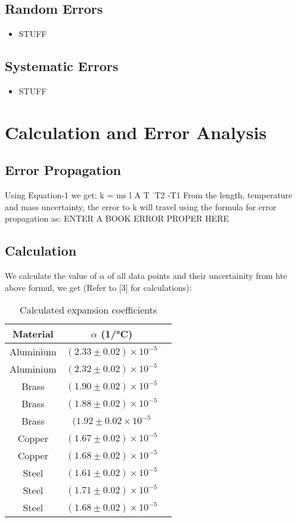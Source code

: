 \documentclass[%
 sor,
 jor,
 amsmath,amssymb,
 reprint,
]{revtex4-2}
\begin{document}
\subsection{Random Errors}
\begin{itemize}
	\item STUFF
\end{itemize}

\subsection{Systematic Errors}
\begin{itemize}
	\item STUFF
\end{itemize}



\section{Calculation and Error Analysis}
\subsection{Error Propagation}
Using Equation-1 we get: k = ms l A T ˙T2 -T1 From the length, temperature and mass uncertainty, the error to k will travel using the formula for error propagation as: ENTER A BOOK ERROR PROPER HERE 
\subsection{Calculation}
We calculate the value of $\alpha$ of all data points and their uncertainity from hte above formul,  we get (Refer to [3] for calculations):

\begin{table}[h]
\centering
\begin{tabular}{ccc}
\hline
Material & $\alpha$ (\si{1/\degreeCelsius}) \\
\hline
Aluminium & $(2.33 \pm 0.02) \times 10^{-5}$ \\
Aluminium & $(2.32\pm 0.02) \times 10^{-5}$ \\
Brass & $(1.90\pm 0.02) \times 10^{-5}$ \\
Brass & $(1.88\pm 0.02) \times 10^{-5}$ \\
Brass & $(1.92\pm 0.02 \times 10^{-5}$ \\
Copper & $(1.67\pm 0.02) \times 10^{-5}$ \\
Copper & $(1.68\pm 0.02) \times 10^{-5}$ \\
Steel & $(1.61\pm 0.02) \times 10^{-5}$ \\
Steel & $(1.71\pm 0.02) \times 10^{-5}$ \\
Steel & $(1.68\pm 0.02) \times 10^{-5}$ \\

\hline


\end{tabular}
\caption{Calculated expansion coefficients}
\end{table}
\end{document}
